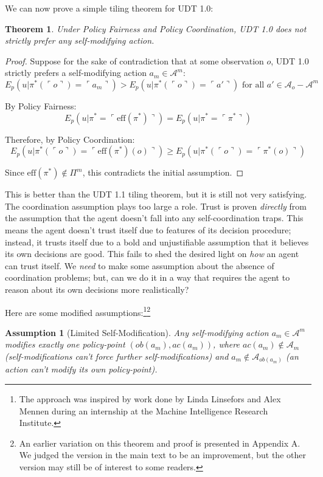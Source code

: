 \documentclass{article}
\newcommand{\qq}[1]{\ulcorner #1 \urcorner}
\newtheorem{assumption}{Assumption}
\newtheorem{theorem}{Theorem}
\begin{document}
We can now prove a simple tiling theorem for UDT 1.0:

\begin{theorem}
Under Policy Fairness and Policy Coordination, UDT 1.0 does not strictly prefer any self-modifying action.
\end{theorem}

\begin{proof}
Suppose for the sake of contradiction that at some observation $o$, UDT 1.0 strictly prefers a self-modifying action $a_m \in \mathcal{A}^m$:
$$ E_p(u|\pi^*(\qq{o})=\qq{a_m}) > E_p(u|\pi^*(\qq{o})=\qq{a'}) \text{ for all } a' \in \mathcal{A}_o - \mathcal{A}^m $$

By Policy Fairness:
$$ E_p(u|\pi^*=\qq{\text{eff}(\pi^*)}) = E_p(u|\pi^*=\qq{\pi^*}) $$

Therefore, by Policy Coordination:
$$ E_p(u|\pi^*(\qq{o})=\qq{\text{eff}(\pi^*)(o)}) \geq E_p(u|\pi^*(\qq{o})=\qq{\pi^*(o)}) $$

Since $\text{eff}(\pi^*) \not \in \Pi^m$, this contradicts the initial assumption.
\end{proof}

This is better than the UDT 1.1 tiling theorem, but it is still not very satisfying. The coordination assumption plays too large a role. Trust is proven \emph{directly} from the assumption that the agent doesn't fall into any self-coordination traps. This means the agent doesn't trust itself due to features of its decision procedure; instead, it trusts itself due to a bold and unjustifiable assumption that it believes its own decisions are good. This fails to shed the desired light on \emph{how} an agent can trust itself. We \emph{need} to make some assumption about the absence of coordination problems; but, can we do it in a way that requires the agent to reason about its own decisions more realistically?

Here are some modified assumptions:\footnote{The approach was inspired by work done by Linda Linsefors and Alex Mennen during an internship at the Machine Intelligence Research Institute.}\footnote{An earlier variation on this theorem and proof is presented in Appendix A. We judged the version in the main text to be an improvement, but the other version may still be of interest to some readers.}

\begin{assumption}[Limited Self-Modification]
Any self-modifying action $a_m \in \mathcal{A}^m$ modifies exactly one policy-point $(ob(a_m), ac(a_m))$, where $ac(a_m) \not\in \mathcal{A}_m$ (self-modifications can't force further self-modifications) and $a_m \notin \mathcal{A}_{ob(a_m)}$ (an action can't modify its own policy-point).
\end{assumption}
\end{document}

